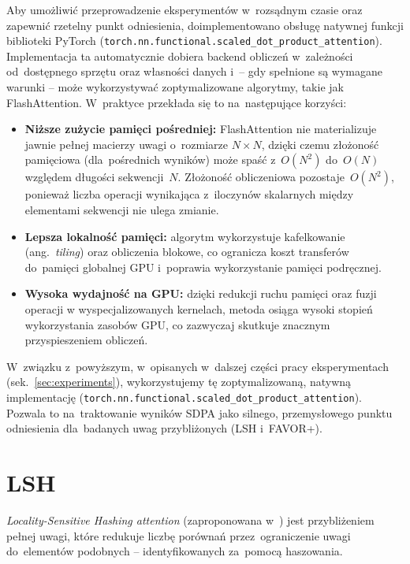 \documentclass[a4paper,11pt,twoside]{report}
\theoremstyle{definition}
\begin{document}
Aby umożliwić przeprowadzenie eksperymentów w~rozsądnym czasie oraz zapewnić rzetelny punkt odniesienia,
doimplementowano obsługę natywnej funkcji biblioteki PyTorch
(\texttt{torch.nn.functional.scaled\_dot\_product\_attention}).
Implementacja ta automatycznie dobiera backend obliczeń w~zależności od~dostępnego sprzętu oraz własności danych i~-- gdy spełnione są wymagane warunki --
może wykorzystywać zoptymalizowane algorytmy, takie jak FlashAttention.
W~praktyce przekłada się to na~następujące korzyści:

\begin{itemize}
    \item \textbf{Niższe zużycie pamięci pośredniej:}
    FlashAttention nie materializuje jawnie pełnej macierzy uwagi o~rozmiarze $N\times N$,
    dzięki czemu złożoność pamięciowa (dla~pośrednich wyników) może spaść z~$O(N^2)$ do~$O(N)$
    względem długości sekwencji~$N$. Złożoność obliczeniowa pozostaje~$O(N^2)$, ponieważ liczba operacji
    wynikająca z~iloczynów skalarnych między elementami sekwencji nie ulega zmianie.

    \item \textbf{Lepsza lokalność pamięci:}
    algorytm wykorzystuje kafelkowanie (ang.\ \textit{tiling}) oraz obliczenia blokowe,
    co ogranicza koszt transferów do~pamięci globalnej GPU i~poprawia wykorzystanie pamięci podręcznej.

    \item \textbf{Wysoka wydajność na GPU:}
    dzięki redukcji ruchu pamięci oraz fuzji operacji w wyspecjalizowanych kernelach,
    metoda osiąga wysoki stopień wykorzystania zasobów GPU, co zazwyczaj skutkuje znacznym przyspieszeniem obliczeń.
\end{itemize}

W~związku z~powyższym, w~opisanych w~dalszej części pracy eksperymentach (sek.~\ref{sec:experiments}), wykorzystujemy tę zoptymalizowaną, natywną implementację (\texttt{torch.nn.functional.scaled\_dot\_product\_attention}). Pozwala to na~traktowanie wyników SDPA jako silnego, przemysłowego punktu odniesienia dla~badanych uwag przybliżonych (LSH i~FAVOR+).




\section{LSH}\label{sec:lsh}

\emph{Locality-Sensitive Hashing attention} (zaproponowana w~\cite{Kitaev2020Reformer:}) jest przybliżeniem pełnej uwagi, które redukuje liczbę porównań przez~ograniczenie uwagi do~elementów podobnych -- identyfikowanych za~pomocą haszowania.
\end{document}
